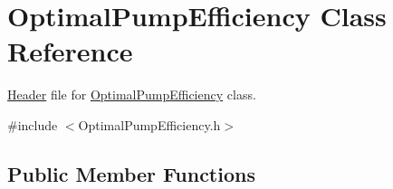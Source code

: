 \hypertarget{class_optimal_pump_efficiency}{}\section{Optimal\+Pump\+Efficiency Class Reference}
\label{class_optimal_pump_efficiency}


\hyperlink{class_header}{Header} file for \hyperlink{class_optimal_pump_efficiency}{Optimal\+Pump\+Efficiency} class.  




{\ttfamily \#include $<$Optimal\+Pump\+Efficiency.\+h$>$}

\subsection*{Public Member Functions}
